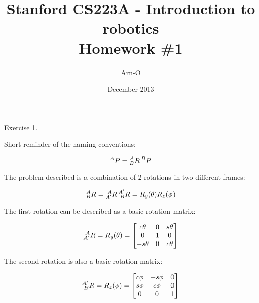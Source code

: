\documentclass{article}
\begin{document}
\title{Stanford CS223A - Introduction to robotics \\
  Homework \#1}
\author{Arn-O}
\date{December 2013}
\maketitle

Exercise 1.

Short reminder of the naming conventions:

\begin{equation}
  \prescript{A}{}{P} = \prescript{A}{B}{R} \prescript{B}{}{P}
\end{equation}

The problem described is a combination of 2 rotations in two different frames:

\begin{equation}
  \prescript{A}{B}{R} = \prescript{A}{A'}{R} \prescript{A'}{B}{R} = R_{y}(\theta) R_{z}(\phi)
\end{equation}

The first rotation can be described as a basic rotation matrix:

\begin{equation}
  \prescript{A}{A'}{R} = R_{y}(\theta) = \begin{bmatrix}
                                            c\theta  & 0 & s\theta \\
                                            0        & 1 & 0        \\
                                            -s\theta & 0 & c\theta
                                          \end{bmatrix}
\end{equation}

The second rotation is also a basic rotation matrix:

\begin{equation}
  \prescript{A'}{B}{R} = R_{z}(\phi) = \begin{bmatrix}
                                          c\phi & -s\phi & 0 \\
                                          s\phi & c\phi  & 0 \\
                                          0     & 0      & 1
                                        \end{bmatrix}
\end{equation}
\end{document}

